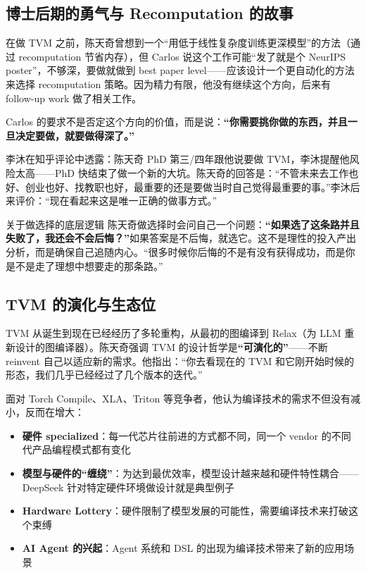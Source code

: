 \documentclass[a4paper]{article}
\begin{document}
\subsection{博士后期的勇气与 Recomputation 的故事}

在做 TVM 之前，陈天奇曾想到一个``用低于线性复杂度训练更深模型''的方法（通过 recomputation 节省内存），但 Carlos 说这个工作可能``发了就是个 NeurIPS poster''，不够深，要做就做到 best paper level------应该设计一个更自动化的方法来选择 recomputation 策略。因为精力有限，他没有继续这个方向，后来有 follow-up work 做了相关工作。

Carlos 的要求不是否定这个方向的价值，而是说：\textbf{``你需要挑你做的东西，并且一旦决定要做，就要做得深了。''}

李沐在知乎评论中透露：陈天奇 PhD 第三/四年跟他说要做 TVM，李沐提醒他风险太高------PhD 快结束了做一个新的大坑。陈天奇的回答是：``不管未来去工作也好、创业也好、找教职也好，最重要的还是要做当时自己觉得最重要的事。''李沐后来评价：``现在看起来这是唯一正确的做事方式。''

\begin{importantbox}{关于做选择的底层逻辑}
陈天奇做选择时会问自己一个问题：\textbf{``如果选了这条路并且失败了，我还会不会后悔？''}如果答案是不后悔，就选它。这不是理性的投入产出分析，而是确保自己追随内心。``很多时候你后悔的不是有没有获得成功，而是你是不是走了理想中想要走的那条路。''
\end{importantbox}

\subsection{TVM 的演化与生态位}

TVM 从诞生到现在已经经历了多轮重构，从最初的图编译到 Relax（为 LLM 重新设计的图编译器）。陈天奇强调 TVM 的设计哲学是\textbf{``可演化的''}------不断 reinvent 自己以适应新的需求。他指出：``你去看现在的 TVM 和它刚开始时候的形态，我们几乎已经经过了几个版本的迭代。''

面对 Torch Compile、XLA、Triton 等竞争者，他认为编译技术的需求不但没有减小，反而在增大：

\begin{itemize}
    \item \textbf{硬件 specialized}：每一代芯片往前进的方式都不同，同一个 vendor 的不同代产品编程模式都有变化
    \item \textbf{模型与硬件的``缠绕''}：为达到最优效率，模型设计越来越和硬件特性耦合------DeepSeek 针对特定硬件环境做设计就是典型例子
    \item \textbf{Hardware Lottery}：硬件限制了模型发展的可能性，需要编译技术来打破这个束缚
    \item \textbf{AI Agent 的兴起}：Agent 系统和 DSL 的出现为编译技术带来了新的应用场景
\end{itemize}
\end{document}
